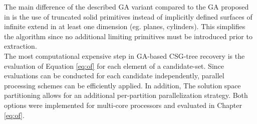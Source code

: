 The main difference of the described \ac{GA} variant compared to the \ac{GA} proposed in \cite{fayolle2016evolutionary} is the use of truncated solid primitives instead of implicitly defined surfaces of infinite extend in at least one dimension (eg. planes, cylinders). 
This simplifies the algorithm since no additional limiting primitives must be introduced prior to extraction.
\\
The most computational expensive step in \ac{GA}-based \ac{CSG}-tree recovery is the evaluation of Equation \ref{eq:of} for each element of a candidate-set. 
Since evaluations can be conducted for each candidate independently, parallel processing schemes can be efficiently applied.  
In addition, The solution space partitioning allows for an additional per-partition parallelization strategy.
Both options were implemented for multi-core processors and evaluated in Chapter \ref{eq:of}.
